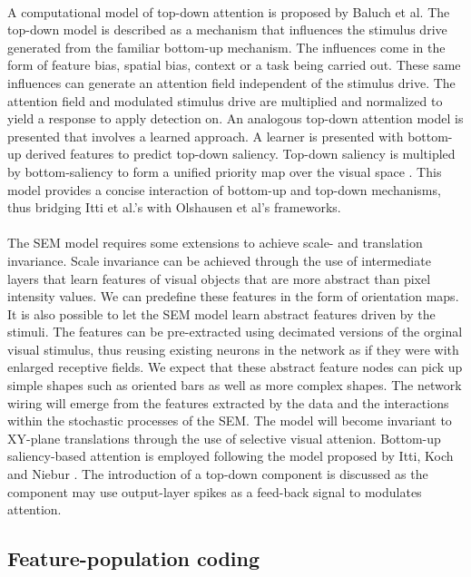 \documentclass{report}
\begin{document}
\paragraph{}A computational model of top-down attention is proposed by Baluch et al. The top-down model is described as a mechanism that influences the stimulus drive generated from the familiar bottom-up mechanism. The influences come in the form of feature bias, spatial bias, context or a task being carried out. These same influences can generate an attention field independent of the stimulus drive. The attention field and modulated stimulus drive are multiplied and normalized to yield a response to apply detection on. An analogous top-down attention model is presented that involves a learned approach. A learner is presented with bottom-up derived features to predict top-down saliency. Top-down saliency is multipled by bottom-saliency to form a unified priority map over the visual space \cite{Baluch2011}. This model provides a concise interaction of bottom-up and top-down mechanisms, thus bridging Itti et al.'s with Olshausen et al's frameworks.

\paragraph{}The SEM model requires some extensions to achieve scale- and translation invariance. Scale invariance can be achieved through the use of intermediate layers that learn features of visual objects that are more abstract than pixel intensity values. We can predefine these features in the form of orientation maps. It is also possible to let the SEM model learn abstract features driven by the stimuli. The features can be pre-extracted using decimated versions of the orginal visual stimulus, thus reusing existing neurons in the network as if they were with enlarged receptive fields. We expect that these abstract feature nodes can pick up simple shapes such as oriented bars as well as more complex shapes. The network wiring will emerge from the features extracted by the data and the interactions within the stochastic processes of the SEM. The model will become invariant to XY-plane translations through the use of selective visual attenion. Bottom-up saliency-based attention is employed following the model proposed by Itti, Koch and Niebur \cite{Itti2000}. The introduction of a top-down component is discussed as the component may use output-layer spikes as a feed-back signal to modulates attention.

\subsection{Feature-population coding}
\end{document}
